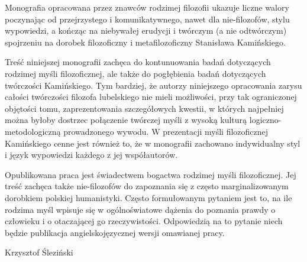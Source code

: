 \documentclass[a4paper]{article}
\begin{document}
Monografia opracowana przez znawców rodzimej filozofii ukazuje liczne walory poczynając od przejrzystego i
komunikatywnego, nawet dla nie-filozofów, stylu wypowiedzi, a kończąc na niebywałej erudycji i twórczym (a nie
odtwórczym) spojrzeniu na dorobek filozoficzny i metafilozoficzny Stanisława Kamińskiego.

Treść niniejszej monografii zachęca do kontunuowania badań dotyczących rodzimej myśli filozoficznej, ale także do
pogłębienia badań dotyczących twórczości Kamińskiego. Tym bardziej, że autorzy niniejszego opracowania zarysu całości
twórczości filozofa lubelskiego nie mieli możliwości, przy tak ograniczonej objętości tomu, zaprezentowania
szczegółowych kwestii, w których najpełniej można byłoby dostrzec połączenie twórczej myśli z wysoką kulturą
logiczno-metodologiczną prowadzonego wywodu. W prezentacji myśli filozoficznej Kamińskiego cenne jest również to, że w
monografii zachowano indywidualny styl i język wypowiedzi każdego z jej współautorów. 

Opublikowana praca jest świadectwem bogactwa rodzimej myśli filozoficznej. Jej treść zachęca także nie-filozofów do
zapoznania się z często marginalizowanym dorobkiem polskiej humanistyki. Często formułowanym pytaniem jest to, na ile
rodzima myśl wpisuje się w ogólnoświatowe dążenia do poznania prawdy o człowieku i o otaczającej go rzeczywistości.
Odpowiedzią na to pytanie niech będzie publikacja angielskojęzycznej wersji omawianej pracy.

{\raggedleft
Krzysztof Śleziński
\par}
\end{document}
